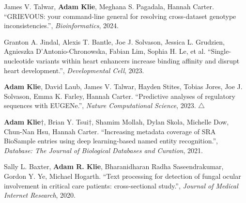 \documentclass[11pt]{formatting-template}
\begin{document}
\begin{vita}
\noindent James V. Talwar, \textbf{Adam Klie}, Meghana S. Pagadala, Hannah Carter. ``GRIEVOUS: your command-line general for resolving cross-dataset genotype inconsistencies.'', \textit{Bioinformatics}, 2024. \newline

\noindent Granton A. Jindal, Alexis T. Bantle, Joe J. Solvason, Jessica L. Grudzien, Agnieszka D’Antonio-Chronowska, Fabian Lim, Sophia H. Le, et al. ``Single-nucleotide variants within heart enhancers increase binding affinity and disrupt heart development.'', \textit{Developmental Cell}, 2023. \newline

\noindent \textbf{Adam Klie}, David Laub, James V. Talwar, Hayden Stites, Tobias Jores, Joe J. Solvason, Emma K. Farley, Hannah Carter. ``Predictive analyses of regulatory sequences with EUGENe.'', \textit{Nature Computational Science}, 2023. $\triangle$ \newline

\noindent \textbf{Adam Klie}$\dagger$, Brian Y. Tsui$\dagger$, Shamim Mollah, Dylan Skola, Michelle Dow, Chun-Nan Hsu, Hannah Carter. ``Increasing metadata coverage of SRA BioSample entries using deep learning-based named entity recognition.'', \textit{Database: The Journal of Biological Databases and Curation}, 2021. \newline

\noindent Sally L. Baxter, \textbf{Adam R. Klie}, Bharanidharan Radha Saseendrakumar, Gordon Y. Ye, Michael Hogarth. ``Text processing for detection of fungal ocular involvement in critical care patients: cross-sectional study.'', \textit{Journal of Medical Internet Research}, 2020. \newline


\end{vita}
\end{document}
